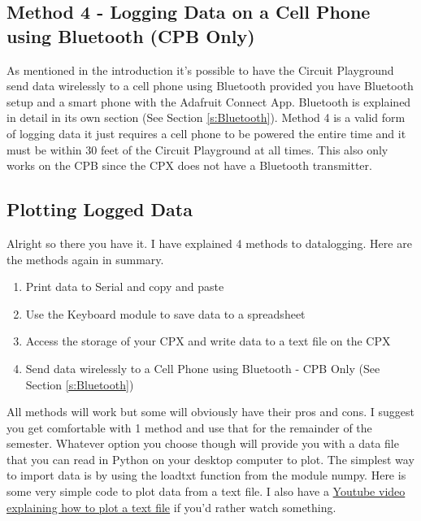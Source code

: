 \subsection{Method 4 - Logging Data on a Cell Phone using Bluetooth
(CPB Only)}

As mentioned in the introduction it's possible to have the Circuit
Playground send data wirelessly to a cell phone using Bluetooth
provided you have Bluetooth setup and a smart phone with the Adafruit
Connect App. Bluetooth is explained in detail in its own section (See
Section \ref{s:Bluetooth}). Method 4 is a valid form of logging data
it just requires a cell phone to be powered the entire time and it
must be within 30 feet of the Circuit Playground at all times. This
also only works on the CPB since the CPX does not have a Bluetooth
transmitter. 

\subsection{Plotting Logged Data}

Alright so there you have it. I have explained 4 methods to
datalogging. Here are the methods again in summary.

\begin{enumerate}[itemsep=-5pt]
\item Print data to Serial and copy and paste
\item Use the Keyboard module to save data to a spreadsheet
\item Access the storage of your CPX and write data to a text file on
the CPX
\item Send data wirelessly to a Cell Phone using Bluetooth - CPB Only (See
Section \ref{s:Bluetooth})
\end{enumerate}

All methods will work but some will obviously have their pros and
cons. I suggest you get comfortable with 1 method and use that for the
remainder of the semester. Whatever option you choose though will
provide you with a data file that you can read in Python on your
desktop computer to plot. The simplest way to import data is by using
the loadtxt function from the module numpy. Here is some very simple
code to plot data from a text file. I also have a \href{https://www.youtube.com/watch?v=tJOz-ty-2ec&list=PL_D7_GvGz-v1RsDs_OdNW65qRjEjmpfQx&index=12}{Youtube video
explaining how to plot a text file} if you’d rather watch something. 

